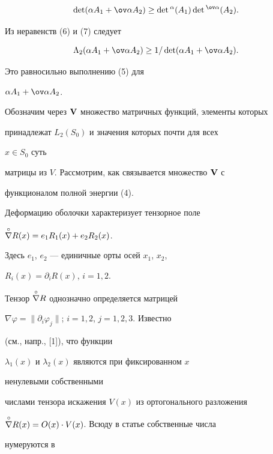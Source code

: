 \begin{pf}
\begin{equation}


\det(\alpha A_1+\ov\alpha A_2)\ge\det{}^\alpha(A_1)


\det{}^{\ov\alpha}(A_2).


\end{equation}


Из неравенств (6) и (7) следует


$$


\Lambda_2(\alpha A_1+\ov\alpha A_2)\ge


1/\det(\alpha A_1+\ov\alpha A_2).


$$


Это равносильно выполнению (5) для


$\alpha A_1+\ov\alpha A_2$.


\end{pf}





Обозначим через $\bold V$ множество матричных функций, элементы которых


принадлежат $L_2(S_0)$ и значения которых почти для всех


$x\in S_0$ суть


матрицы из $V$. Рассмотрим, как связывается множество $\bold V$ с


функционалом полной энергии (4).





Деформацию оболочки характеризует тензорное поле


$\overset{\circ}{\nabla}{}R(x)=e_1R_1(x)+e_2R_2(x)$.


Здесь $e_1$, $e_2$ --- единичные орты осей $x_1$, $x_2$,


$R_i(x)=\partial_iR(x)$, $i=1,2$.


Тензор $\overset{\circ}{\nabla}{}R$ однозначно определяется матрицей


$\nabla\varphi=\|\partial_i\varphi_j\|$; $i=1,2$, $j=1,2,3$. Известно


(см., напр., [1]), что функции


$\lambda_1(x)$ и $\lambda_2(x)$ являются при фиксированном $x$


ненулевыми собственными


числами тензора искажения $V(x)$ из ортогонального разложения


$\overset{\circ}{\nabla}{}R(x)=O(x)\cdot V(x)$. Всюду в статье собственные числа


нумеруются в


